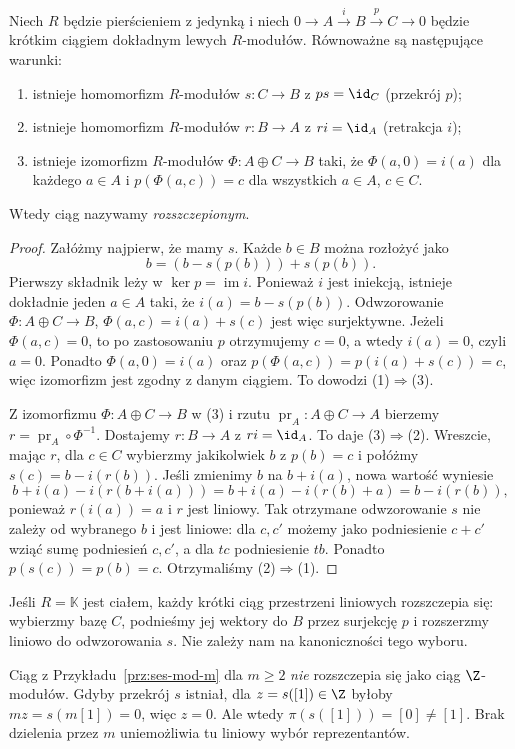 \begin{twierdzenie}
\label{thm:ses-rozszczepienie}
Niech $R$ będzie pierścieniem z jedynką i niech
$0\to A\xrightarrow{i}B\xrightarrow{p}C\to0$
będzie krótkim ciągiem dokładnym lewych $R$-modułów.
Równoważne są następujące warunki:
\begin{enumerate}[leftmargin=*]
\item istnieje homomorfizm $R$-modułów $s:C\to B$
      z $ps=\id_C$ (przekrój $p$);
\item istnieje homomorfizm $R$-modułów $r:B\to A$
      z $ri=\id_A$ (retrakcja $i$);
\item istnieje izomorfizm $R$-modułów
      $\Phi:A\oplus C\to B$ taki, że
      $\Phi(a,0)=i(a)$ dla każdego $a\in A$ i
      $p(\Phi(a,c))=c$ dla wszystkich $a\in A$, $c\in C$.
\end{enumerate}
Wtedy ciąg nazywamy \emph{rozszczepionym}.
\end{twierdzenie}
\begin{proof}
Załóżmy najpierw, że mamy $s$.
Każde $b\in B$ można rozłożyć jako
\[
 b=(b-s(p(b)))+s(p(b)).
\]
Pierwszy składnik leży w $\ker p=\operatorname{im}i$.
Ponieważ $i$ jest iniekcją, istnieje dokładnie
jeden $a\in A$ taki, że $i(a)=b-s(p(b))$.
Odwzorowanie
$\Phi:A\oplus C\to B$, $\Phi(a,c)=i(a)+s(c)$
jest więc surjektywne. Jeżeli $\Phi(a,c)=0$,
to po zastosowaniu $p$ otrzymujemy $c=0$,
a wtedy $i(a)=0$, czyli $a=0$.
Ponadto $\Phi(a,0)=i(a)$ oraz
$p(\Phi(a,c))=p(i(a)+s(c))=c$,
więc izomorfizm jest zgodny z danym ciągiem.
To dowodzi (1)$\Rightarrow$(3).

Z izomorfizmu $\Phi:A\oplus C\to B$ w (3) i rzutu
$\operatorname{pr}_A:A\oplus C\to A$ bierzemy
$r=\operatorname{pr}_A\circ\Phi^{-1}$. Dostajemy
$r:B\to A$ z $ri=\id_A$. To daje (3)$\Rightarrow$(2).
Wreszcie, mając $r$, dla $c\in C$ wybierzmy
jakikolwiek $b$ z $p(b)=c$ i połóżmy
$s(c)=b-i(r(b))$. Jeśli zmienimy $b$ na
$b+i(a)$, nowa wartość wyniesie
\[
 b+i(a)-i(r(b+i(a)))
 =b+i(a)-i(r(b)+a)=b-i(r(b)),
\]
ponieważ $r(i(a))=a$ i $r$ jest liniowy.
Tak otrzymane odwzorowanie $s$ nie zależy od
wybranego $b$ i jest liniowe: dla $c,c'$
możemy jako podniesienie $c+c'$ wziąć sumę
podniesień $c,c'$, a dla $tc$ podniesienie $tb$.
Ponadto $p(s(c))=p(b)=c$.
Otrzymaliśmy (2)$\Rightarrow$(1).
\end{proof}

\begin{uwaga}
Jeśli $R=\mathbb K$ jest ciałem, każdy krótki
ciąg przestrzeni liniowych rozszczepia się:
wybierzmy bazę $C$, podnieśmy jej wektory
do $B$ przez surjekcję $p$ i rozszerzmy
liniowo do odwzorowania $s$. Nie zależy nam na
kanoniczności tego wyboru.

Ciąg z Przykładu~\ref{prz:ses-mod-m} dla
$m\geq2$ \emph{nie} rozszczepia się jako
ciąg $\Z$-modułów. Gdyby przekrój $s$
istniał, dla $z=s([1])\in\Z$ byłoby
$mz=s(m[1])=0$, więc $z=0$.
Ale wtedy $\pi(s([1]))=[0]\ne[1]$.
Brak dzielenia przez $m$ uniemożliwia tu
liniowy wybór reprezentantów.
\end{uwaga}
